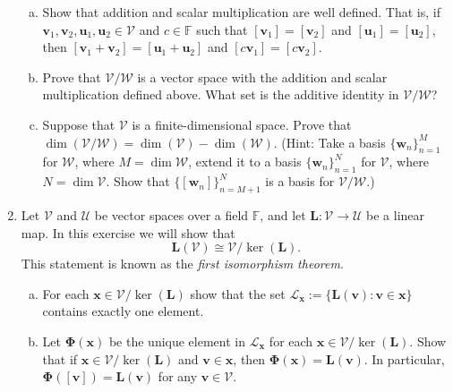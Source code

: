 \documentclass[12pt]{amsart}
\newcommand{\1}{\mathbbm{1}}
\numberwithin{equation}{section}
\numberwithin{Theorem}{section}
\theoremstyle{plain} %
\theoremstyle{definition}
\theoremstyle{remark}
\begin{document}
\begin{enumerate}[1.]
\begin{enumerate}[(a)]
\item Show that addition and scalar multiplication are well defined. That is, if \(\mathbf{v}_{1},\mathbf{v}_{2},\mathbf{u}_{1},\mathbf{u}_{2}\in\mathcal{V}\) and \(c\in\mathbb{F}\) such that \([\mathbf{v}_{1}]=[\mathbf{v}_{2}]\) and \([\mathbf{u}_{1}]=[\mathbf{u}_{2}]\), then \([\mathbf{v}_{1}+\mathbf{v}_{2}]=[\mathbf{u}_{1}+\mathbf{u}_{2}]\) and \([c\mathbf{v}_{1}]=[c\mathbf{v}_{2}]\).

\bigskip

\item Prove that \(\mathcal{V}/\mathcal{W}\) is a vector space with the addition and scalar multiplication defined above. What set is the additive identity in \(\mathcal{V}/\mathcal{W}\)?

\bigskip

\item Suppose that \(\mathcal{V}\) is a finite-dimensional space. Prove that \(\operatorname{dim}(\mathcal{V}/\mathcal{W}) = \operatorname{dim}(\mathcal{V}) - \operatorname{dim}(\mathcal{W})\). (Hint: Take a basis \(\{\mathbf{w}_{n}\}_{n=1}^{M}\) for \(\mathcal{W}\), where \(M=\operatorname{dim}\mathcal{W}\), extend it to a basis \(\{\mathbf{w}_{n}\}_{n=1}^{N}\) for \(\mathcal{V}\), where \(N=\operatorname{dim}\mathcal{V}\). Show that \(\{[\mathbf{w}_{n}]\}_{n=M+1}^{N}\) is a basis for \(\mathcal{V}/\mathcal{W}\).)

\bigskip

\end{enumerate}

\item Let \(\mathcal{V}\) and \(\mathcal{U}\) be vector spaces over a field \(\mathbb{F}\), and let \(\mathbf{L}:\mathcal{V}\to\mathcal{U}\) be a linear map. In this exercise we will show that
\[\mathbf{L}(\mathcal{V})\cong \mathcal{V}/\operatorname{ker}(\mathbf{L}).\]
This statement is known as the \textit{first isomorphism theorem}.

\bigskip

\begin{enumerate}[(a)]

\item For each \(\mathbf{x}\in\mathcal{V}/\operatorname{ker}(\mathbf{L})\) show that the set \(\mathcal{L}_{\mathbf{x}}:=\{\mathbf{L}(\mathbf{v}) : \mathbf{v}\in\mathbf{x}\}\) contains exactly one element.

\bigskip

\item Let \(\mathbf{\Phi}(\mathbf{x})\) be the unique element in \(\mathcal{L}_{\mathbf{x}}\) for each \(\mathbf{x}\in\mathcal{V}/\operatorname{ker}(\mathbf{L})\). Show that if \(\mathbf{x}\in\mathcal{V}/\operatorname{ker}(\mathbf{L})\) and \(\mathbf{v}\in\mathbf{x}\), then \(\mathbf{\Phi}(\mathbf{x}) = \mathbf{L}(\mathbf{v})\). In particular, \(\mathbf{\Phi}([\mathbf{v}]) = \mathbf{L}(\mathbf{v})\) for any \(\mathbf{v}\in\mathcal{V}\). 


\end{enumerate}
\end{enumerate}
\end{document}

